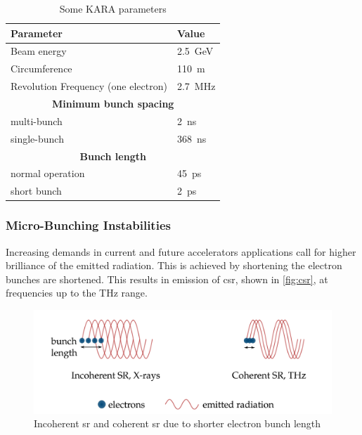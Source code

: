 \begin{table}[tbh]
	\caption{Some KARA parameters \cite{rota2018}}
	\label{tab:kara}
	\centering
	\begin{tabular}{ll}
		\toprule
		\textbf{Parameter}                  & \textbf{Value}                \\ \midrule
		Beam energy                         & \SI{2.5}{\giga \electronvolt} \\
		Circumference                       & \SI{110}{\meter}              \\
		Revolution Frequency (one electron) & \SI{2.7}{\mega \hertz}        \\
		\multicolumn{2}{c}{\textbf{Minimum bunch spacing}}              \\
		\quad multi-bunch                   & \SI{2}{\nano \second}         \\
		\quad single-bunch                  & \SI{368}{\nano \second}       \\
		\multicolumn{2}{c}{\textbf{Bunch length}}                   \\
		\quad normal operation              & \SI{45}{\pico \second}        \\
		\quad short bunch                   & \SI{2}{\pico \second}         \\ \bottomrule
	\end{tabular}
\end{table}



\subsubsection*{Micro-Bunching Instabilities}
Increasing demands in current and future accelerators applications call for higher brilliance of the emitted radiation.
This is achieved by shortening the electron bunches are shortened. This results in emission of \gls{csr}, shown in \autoref{fig:csr}, at frequencies up to the THz range.

\begin{figure}[tbh]
	\centering
	\includegraphics[width = \textwidth]{chap/02-theory/img/csr2.png}
	\caption[Incoherent SR and CSR]{Incoherent \gls{sr} and coherent \gls{sr} due to shorter electron bunch length \cite{rota2018}}
	\label{fig:csr}
\end{figure}

